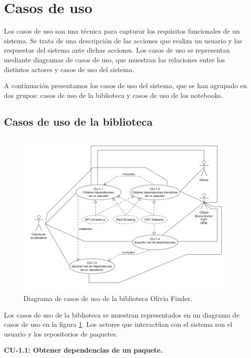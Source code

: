 \section{Casos de uso}

Los casos de uso son una técnica para capturar los requisitos funcionales de un sistema. Se trata de una
descripción de las acciones que realiza un usuario y las respuestas del sistema ante dichas acciones.
Los casos de uso se representan mediante diagramas de casos de uso, que muestran las relaciones entre los distintos actores y casos de uso del sistema.

A continuación presentamos los casos de uso del sistema, que se han agrupado en dos grupos: casos de uso de la biblioteca y casos de uso de los notebooks.

\subsection{Casos de uso de la biblioteca}

\begin{figure}[ht!]
	\centering
	\includegraphics[width=1\textwidth]{img/anexos/CU_of.png}
	\caption{Diagrama de casos de uso de la biblioteca Olivia Finder.}
	\label{fig:casos_de_uso}
\end{figure}

Los casos de uso de la biblioteca se muestran representados en un diagrama de casos de uso en la figura \ref{fig:casos_de_uso}.
Los actores que interactúan con el sistema son el usuario y los repositorios de paquetes.

\textbf{CU-1.1: Obtener dependencias de un paquete.}

